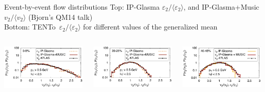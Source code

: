 \documentclass[svgnames]{beamer}
\newcommand{\trento}{T\raisebox{-.5ex}{R}ENTo}
\begin{document}
\begin{frame}[t]{Event-by-event flow distributions}
 Top: IP-Glasma $\varepsilon_2/\langle \varepsilon_2 \rangle$, and IP-Glasma+Music $v_2/\langle v_2 \rangle$ ({\footnotesize Bjorn's QM14 talk}) \\
 \vspace{0.05 in}
 Bottom: \trento\, $\varepsilon_2/\langle \varepsilon_2 \rangle$ for different values of the generalized mean \\
 \vspace{0.1 in}
 \begin{columns}
  \begin{column}{0.33\textwidth}
    \centering \includegraphics[width=\columnwidth]{ebe-flow/bjorn_01}
  \end{column}
  \begin{column}{0.33\textwidth}
    \centering \includegraphics[width=\columnwidth]{ebe-flow/bjorn_02}
  \end{column}
  \begin{column}{0.33\textwidth}
    \centering \includegraphics[width=\columnwidth]{ebe-flow/bjorn_03}

\end{column}
\end{columns}
\end{frame}
\end{document}
